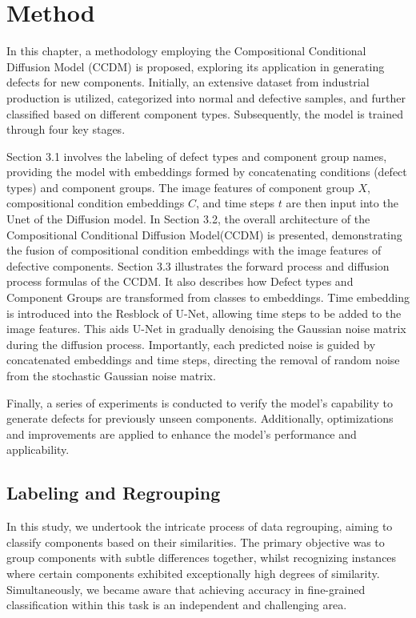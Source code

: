 \chapter{Method}
\label{chapter:secorder}

In this chapter, a methodology employing the Compositional Conditional Diffusion Model (CCDM) is proposed, exploring its application in generating defects for new components. Initially, an extensive dataset from industrial production is utilized, categorized into normal and defective samples, and further classified based on different component types. Subsequently, the model is trained through four key stages.

Section 3.1 involves the labeling of defect types and component group names, providing the model with embeddings formed by concatenating conditions (defect types) and component groups. The image features of component group \(X\), compositional condition embeddings \(C\), and time steps \(t\) are then input into the Unet\cite{Unet} of the Diffusion model\cite{nonequilibrium}. In Section 3.2, the overall architecture of the Compositional Conditional Diffusion Model(CCDM) is presented, demonstrating the fusion of compositional condition embeddings with the image features of defective components. Section 3.3 illustrates the forward process and diffusion process formulas of the CCDM. It also describes how Defect types and Component Groups are transformed from classes to embeddings. Time embedding is introduced into the Resblock\cite{Resblock} of U-Net, allowing time steps to be added to the image features. This aids U-Net in gradually denoising the Gaussian noise matrix during the diffusion process. Importantly, each predicted noise is guided by concatenated embeddings and time steps, directing the removal of random noise from the stochastic Gaussian noise matrix.

Finally, a series of experiments is conducted to verify the model's capability to generate defects for previously unseen components. Additionally, optimizations and improvements are applied to enhance the model's performance and applicability.
\newpage

 
\section{Labeling and Regrouping}
In this study, we undertook the intricate process of data regrouping, aiming to classify components based on their similarities. The primary objective was to group components with subtle differences together, whilst recognizing instances where certain components exhibited exceptionally high degrees of similarity. Simultaneously, we became aware that achieving accuracy in fine-grained classification within this task is an independent and challenging area.

